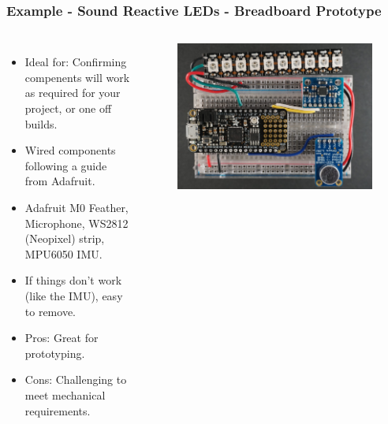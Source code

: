 \documentclass[aspectratio=169, t]{beamer}
\begin{document}
\begin{frame}
\frametitle{Example - Sound Reactive LEDs - Breadboard Prototype}
\vspace{-5mm}
\begin{columns}
	\begin{itemize}
		\item Ideal for: Confirming compenents will work as required for your project, or one off builds.
		\item Wired components following a guide from Adafruit.
		\item Adafruit M0 Feather, Microphone, WS2812 (Neopixel) strip, MPU6050 IMU.
		\item If things don't work (like the IMU), easy to remove.
		\item Pros: Great for prototyping.
		\item Cons: Challenging to meet mechanical requirements.
	\end{itemize}
	\begin{figure}
		\includegraphics[width=\linewidth]{images/breadboard.JPG}
	\end{figure}
\end{columns}
\end{frame}
\end{document}
